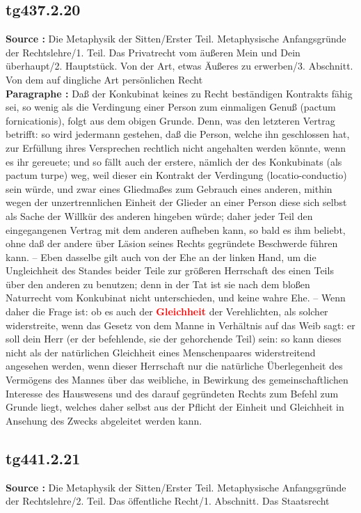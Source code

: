 \documentclass[a4paper,12pt,twoside]{book}
\newcommand{\match}[1]{\textcolor{red}{\textbf{#1}}}
\begin{document}
	\subsection*{tg437.2.20} 
	\textbf{Source : }Die Metaphysik der Sitten/Erster Teil. Metaphysische Anfangsgründe der Rechtslehre/1. Teil. Das Privatrecht vom äußeren Mein und Dein überhaupt/2. Hauptstück. Von der Art, etwas Äußeres zu erwerben/3. Abschnitt. Von dem auf dingliche Art persönlichen Recht\\  
	
	\textbf{Paragraphe : }Daß der Konkubinat keines zu Recht beständigen Kontrakts fähig sei, so wenig als die Verdingung einer Person zum einmaligen Genuß (pactum fornicationis), folgt aus dem obigen Grunde. Denn, was den letzteren Vertrag betrifft: so wird jedermann gestehen, daß die Person, welche ihn geschlossen hat, zur Erfüllung ihres Versprechen rechtlich nicht angehalten werden könnte, wenn es ihr gereuete; und so fällt auch der erstere, nämlich der des Konkubinats (als pactum turpe) weg, weil dieser ein Kontrakt der Verdingung (locatio-conductio) sein würde, und zwar eines Gliedmaßes zum Gebrauch eines anderen, mithin wegen der unzertrennlichen Einheit der  Glieder an einer Person diese sich selbst als Sache der Willkür des anderen hingeben würde; daher jeder Teil den eingegangenen Vertrag mit dem anderen aufheben kann, so bald es ihm beliebt, ohne daß der andere über Läsion seines Rechts gegründete Beschwerde führen kann. – Eben dasselbe gilt auch von der Ehe an der linken Hand, um die Ungleichheit des Standes beider Teile zur größeren Herrschaft des einen Teils über den anderen zu benutzen; denn in der Tat ist sie nach dem bloßen Naturrecht vom Konkubinat nicht unterschieden, und keine wahre Ehe. – Wenn daher die Frage ist: ob es auch der \match{Gleichheit} der Verehlichten, als solcher widerstreite, wenn das Gesetz von dem Manne in Verhältnis auf das Weib sagt: er soll dein Herr (er der befehlende, sie der gehorchende Teil) sein: so kann dieses nicht als der natürlichen Gleichheit eines Menschenpaares widerstreitend angesehen werden, wenn dieser Herrschaft nur die natürliche Überlegenheit des Vermögens des Mannes über das weibliche, in Bewirkung des gemeinschaftlichen Interesse des Hauswesens und des darauf gegründeten Rechts zum Befehl zum Grunde liegt, welches daher selbst aus der Pflicht der Einheit und Gleichheit in Ansehung des Zwecks abgeleitet werden kann. 
	
	\subsection*{tg441.2.21} 
	\textbf{Source : }Die Metaphysik der Sitten/Erster Teil. Metaphysische Anfangsgründe der Rechtslehre/2. Teil. Das öffentliche Recht/1. Abschnitt. Das Staatsrecht\\  
	
\end{document}
